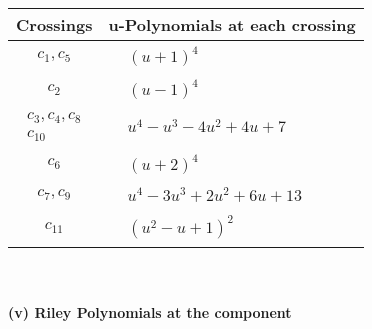 \documentclass[1p]{elsarticle_modified}
\theoremstyle{definition}
\begin{document}
\begin{tabular}{m{50pt}|m{274pt}}
Crossings & \hspace{64pt}u-Polynomials at each crossing \\
\hline $$\begin{aligned}c_{1},c_{5}\end{aligned}$$&$\begin{aligned}
&(u+1)^4
\end{aligned}$\\
\hline $$\begin{aligned}c_{2}\end{aligned}$$&$\begin{aligned}
&(u-1)^4
\end{aligned}$\\
\hline $$\begin{aligned}c_{3},c_{4},c_{8}\\c_{10}\end{aligned}$$&$\begin{aligned}
&u^4- u^3-4 u^2+4 u+7
\end{aligned}$\\
\hline $$\begin{aligned}c_{6}\end{aligned}$$&$\begin{aligned}
&(u+2)^4
\end{aligned}$\\
\hline $$\begin{aligned}c_{7},c_{9}\end{aligned}$$&$\begin{aligned}
&u^4-3 u^3+2 u^2+6 u+13
\end{aligned}$\\
\hline $$\begin{aligned}c_{11}\end{aligned}$$&$\begin{aligned}
&(u^2- u+1)^2
\end{aligned}$\\
\hline
\end{tabular}\\~\\
\newpage\renewcommand{\arraystretch}{1}
\flushleft \textbf{(v) Riley Polynomials at the component}\newline \\
\end{document}

